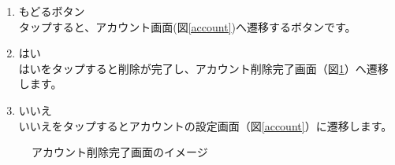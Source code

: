 \documentclass[a4j]{jarticle}
\begin{document}
\begin{enumerate}
  \renewcommand{\labelenumi}{\textcircled{\scriptsize \theenumi}}
\item もどるボタン\\
  タップすると、アカウント画面(図\ref{account})へ遷移するボタンです。
\item はい\\
  はいをタップすると削除が完了し、アカウント削除完了画面（図\ref{check}）へ遷移します。
\item いいえ\\
  いいえをタップするとアカウントの設定画面（図\ref{account}）に遷移します。
\end{enumerate}

\begin{figure}[H]
    \begin{center}
    \caption {アカウント削除完了画面のイメージ}
    \label{check}
    \end{center}
\end{figure}
\end{document}
